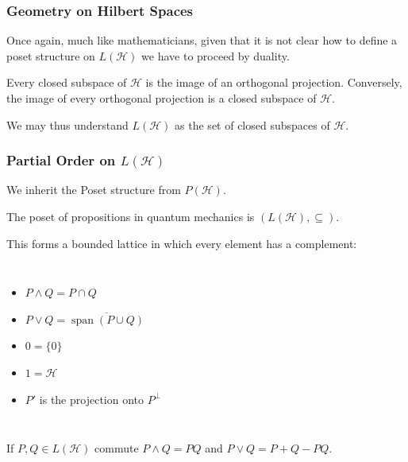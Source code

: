 \documentclass{beamer}
\DeclareMathOperator{\Span}{span}
\begin{document}
\begin{frame}

	\frametitle{Geometry on Hilbert Spaces}
	
	Once again, much like mathematicians, given that it is not clear how to define a poset structure on $L(\mathcal{H})$ we have to proceed by duality.
	
	\begin{theorem}
	
		Every closed subspace of $\mathcal{H}$ is the image of an orthogonal projection. Conversely, the image of every orthogonal projection is a closed subspace of $\mathcal{H}$.	
	
	\end{theorem}
	
	We may thus understand $L(\mathcal{H})$ as the set of closed subspaces of $\mathcal{H}$.

\end{frame}	

\begin{frame}

	\frametitle{Partial Order on $L(\mathcal{H})$}
	
	We inherit the Poset structure from $P(\mathcal{H})$. 
	
	\begin{definition}
	
		The poset of propositions in quantum mechanics is $(L(\mathcal{H}),\subseteq)$.	
	
	\end{definition}

This forms a bounded lattice in which every element has a complement:

	\begin{columns}

		\begin{itemize}
	
			\item $P\wedge Q=P\cap Q$
			\item $P\vee Q = \overline{\Span (P\cup Q)}$
			\item $0=\{0\}$
			\item $1=\mathcal{H}$
			\item $P'$ is the projection onto $P^\bot$
	
		\end{itemize}


	\end{columns}
	
	\begin{theorem}
		
		If $P,Q\in L(\mathcal{H})$ commute $P\wedge Q=PQ$ and $P\vee Q=P+Q-PQ$.		
		
	\end{theorem}

\end{frame}
\end{document}
